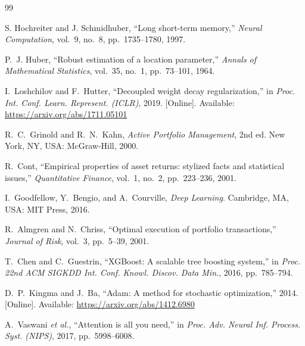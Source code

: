 \documentclass[withoutpreface,bwprint]{cumcmthesis}
\begin{document}
\newpage
\begin{thebibliography}{99}

S. Hochreiter and J. Schmidhuber, ``Long short-term memory,'' \textit{Neural Computation}, vol.~9, no.~8, pp.~1735--1780, 1997.

P.~J. Huber, ``Robust estimation of a location parameter,'' \textit{Annals of Mathematical Statistics}, vol.~35, no.~1, pp.~73--101, 1964.

I.~Loshchilov and F.~Hutter, ``Decoupled weight decay regularization,'' in \textit{Proc. Int. Conf. Learn. Represent. (ICLR)}, 2019. [Online]. Available: \url{https://arxiv.org/abs/1711.05101}

R.~C.~Grinold and R.~N.~Kahn, \textit{Active Portfolio Management}, 2nd ed. New York, NY, USA: McGraw-Hill, 2000.

R.~Cont, ``Empirical properties of asset returns: stylized facts and statistical issues,'' \textit{Quantitative Finance}, vol.~1, no.~2, pp.~223--236, 2001.

I.~Goodfellow, Y.~Bengio, and A.~Courville, \textit{Deep Learning}. Cambridge, MA, USA: MIT Press, 2016.

R.~Almgren and N.~Chriss, ``Optimal execution of portfolio transactions,'' \textit{Journal of Risk}, vol.~3, pp.~5--39, 2001.

T.~Chen and C.~Guestrin, ``XGBoost: A scalable tree boosting system,'' in \textit{Proc. 22nd ACM SIGKDD Int. Conf. Knowl. Discov. Data Min.}, 2016, pp.~785--794.

D.~P.~Kingma and J.~Ba, ``Adam: A method for stochastic optimization,'' 2014. [Online]. Available: \url{https://arxiv.org/abs/1412.6980}

A.~Vaswani \textit{et al.}, ``Attention is all you need,'' in \textit{Proc. Adv. Neural Inf. Process. Syst. (NIPS)}, 2017, pp.~5998--6008.

\end{thebibliography}
\end{document}
